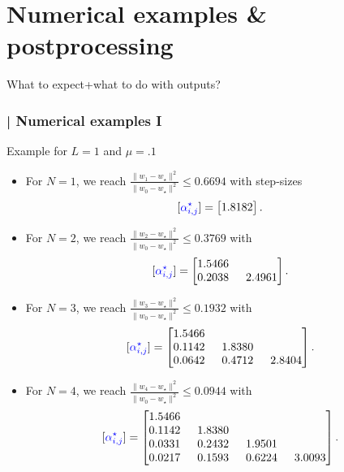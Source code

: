 \documentclass[aspectratio=169]{beamer}
\newcommand{\bc}[1]{{\color{blue}#1}}
\renewcommand{\leq}{\leqslant}
\newcommand{\titleB}[1]{{}|\! #1}
\newcommand{\frtitle}[1]{\frametitle{\titleB{#1}}}
\begin{document}
\begin{frame}
	\Large
	\tableofcontents
\end{frame}
\section{Numerical examples \& postprocessing}
\begin{frame}
	\Large
\end{frame}

\begin{frame}{What to expect+what to do with outputs?}

\end{frame}


			\begin{frame}\frtitle{Numerical examples I}\scriptsize
				\vspace{.3cm}
				Example for $L=1$ and $\mu=.1$
				\begin{itemize}
					\item<2-> For $N=1$, we reach $\tfrac{\|w_1-w_\star\|^2}{\|w_0-w_\star\|^2} \leq 0.6694$ with step-sizes
					\[ [\bc{\alpha_{i,j}^\star}]=\begin{bmatrix} 1.8182   \end{bmatrix}.\]
					\item<3-> For $N=2$, we reach $\tfrac{\|w_2-w_\star\|^2}{\|w_0-w_\star\|^2} \leq 0.3769$ with
					\[ [\bc{\alpha_{i,j}^\star}]=\begin{bmatrix} 1.5466 &   \\
					0.2038 & \,\,\,2.4961    \end{bmatrix}.\]
					\item<4-> For $N=3$, we reach $\tfrac{\|w_3-w_\star\|^2}{\|w_0-w_\star\|^2} \leq 0.1932$ with
					\[ [\bc{\alpha_{i,j}^\star}]=\begin{bmatrix}  1.5466  &  &   \\
					0.1142 & \,\,\,1.8380 &   \\
					0.0642 & \,\,\,0.4712 & \,\,\,2.8404    \end{bmatrix}.\]
					\item<5-> For $N=4$, we reach  $\tfrac{\|w_4-w_\star\|^2}{\|w_0-w_\star\|^2} \leq 0.0944$ with
					\[ [\bc{\alpha_{i,j}^\star}]=\begin{bmatrix}   1.5466 &  &  &  \\
					0.1142 & \,\,\,1.8380 &  &   \\
					0.0331 & \,\,\,0.2432 & \,\,\,1.9501 &   \\
					0.0217 & \,\,\,0.1593 & \,\,\,0.6224 & \,\,\,3.0093  \end{bmatrix}.\]
				\end{itemize}
			\end{frame}
\end{document}
